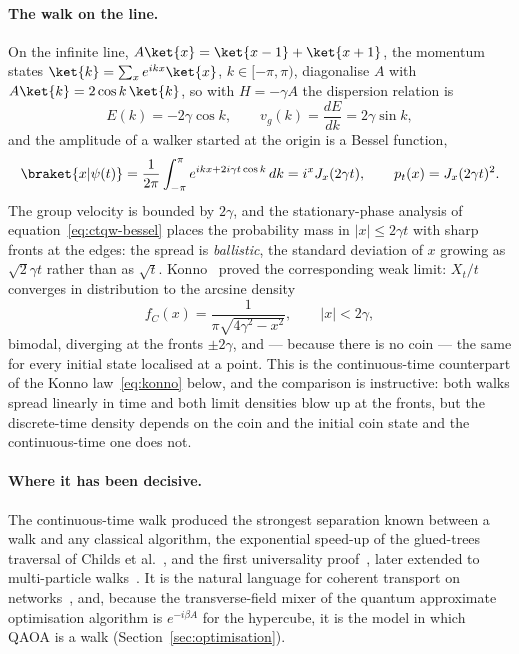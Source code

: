 \paragraph*{The walk on the line.}
On the infinite line, $A\ket{x} = \ket{x-1} + \ket{x+1}$, the momentum states
$\ket{k} = \sum_x e^{ikx}\ket{x}$, $k \in [-\pi, \pi)$, diagonalise $A$ with
$A\ket{k} = 2\cos k\,\ket{k}$, so with $H = -\gamma A$ the dispersion relation
is
\begin{equation}
	E(k) = -2\gamma \cos k, \qquad v_g(k) = \frac{dE}{dk} = 2\gamma \sin k,
	\label{eq:ctqw-dispersion}
\end{equation}
and the amplitude of a walker started at the origin is a Bessel function,
\begin{equation}
	\braket{x|\psi(t)} = \frac{1}{2\pi}\int_{-\pi}^{\pi} e^{ikx + 2i\gamma t\cos k}\,dk = i^{x} J_x(2\gamma t),
	\qquad p_t(x) = J_x(2\gamma t)^2 .
	\label{eq:ctqw-bessel}
\end{equation}
The group velocity is bounded by $2\gamma$, and the stationary-phase
analysis of equation~\eqref{eq:ctqw-bessel} places the probability mass in
$|x| \le 2\gamma t$ with sharp fronts at the edges: the spread is
\emph{ballistic}, the standard deviation of $x$ growing as $\sqrt{2}\gamma t$
rather than as $\sqrt{t}$. Konno~\cite{Konno_2005} proved the corresponding
weak limit: $X_t/t$ converges in distribution to the arcsine density
\begin{equation}
	f_C(x) = \frac{1}{\pi\sqrt{4\gamma^2 - x^2}}, \qquad |x| < 2\gamma ,
	\label{eq:ctqw-limit}
\end{equation}
bimodal, diverging at the fronts $\pm 2\gamma$, and --- because there is no
coin --- the same for every initial state localised at a point. This is the
continuous-time counterpart of the Konno law~\eqref{eq:konno} below, and the
comparison is instructive: both walks spread linearly in time and both limit
densities blow up at the fronts, but the discrete-time density depends on
the coin and the initial coin state and the continuous-time one does not.

\paragraph*{Where it has been decisive.}
The continuous-time walk produced the strongest separation known between a
walk and any classical algorithm, the exponential speed-up of the
glued-trees traversal of Childs et al.~\cite{Childs_2001, Childs_2002}, and
the first universality proof~\cite{PhysRevLett.102.180501}, later extended to
multi-particle walks~\cite{Childs_2012}. It is the natural language for
coherent transport on networks~\cite{Mlken_2011}, and, because the
transverse-field mixer of the quantum approximate optimisation algorithm is
$e^{-i\beta A}$ for the hypercube, it is the model in which QAOA is a walk
(Section~\ref{sec:optimisation}).

